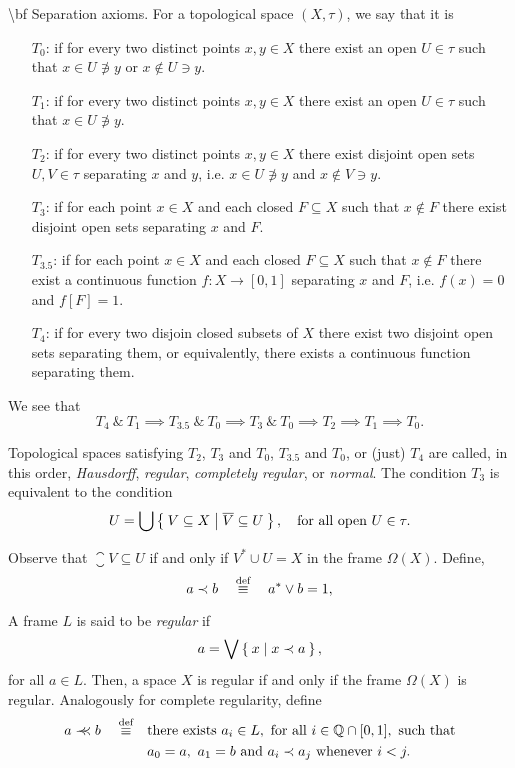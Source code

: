 \num {\bf Separation axioms.} For a topological space $(X,\tau)$, we say that it is
\begin{itemize}
    \item[$T_0$:] if for every two distinct points $x,y\in X$ there exist an open $U\in \tau$ such that $x\in U\not\ni y$ or $x\not\in U\ni y$.
    \item[$T_1$:] if for every two distinct points $x,y\in X$ there exist an open $U\in \tau$ such that $x\in U\not\ni y$.
    \item[$T_2$:] if for every two distinct points $x,y\in X$ there exist disjoint open sets $U,V\in \tau$ separating $x$ and $y$, i.e. $x\in U\not\ni y$ and $x\not\in V\ni y$.
    \item[$T_3$:] if for each point $x\in X$ and each closed $F\subseteq X$ such that $x\notin F$ there exist disjoint open sets separating $x$ and $F$.
    \item[$T_{3.5}$:] if for each point $x\in X$ and each closed $F\subseteq X$ such that $x\notin F$ there exist a continuous function $f\colon X\to [0,1]$ separating $x$ and $F$, i.e. $f(x) = 0$ and $f[F] = 1$.
    \item[$T_{4}$:] if for every two disjoin closed subsets of $X$ there exist two disjoint open sets separating them, or equivalently, there exists a continuous function separating them.
\end{itemize}

We see that
$$ T_4~\&~T_1 \implies T_{3.5}~\&~T_0 \implies T_3~\&~T_0 \implies T_2 \implies T_1 \implies T_0. $$

\noindent Topological spaces satisfying $T_2$, $T_3$ and $T_0$, $T_{3.5}$ and $T_0$, or (just) $T_4$ are called, in this order, \emph{Hausdorff}, \emph{regular}, \emph{completely regular}, or \emph{normal}.
The condition $T_3$ is equivalent to the condition
$$U = \bigcup \Set{ V\subseteq X | \overline{V} \subseteq U},\quad\text{for all open } U\in \tau.$$

Observe that $\closure V\subseteq U$ if and only if $V^*\cup U = X$ in the frame $\Omega(X)$. Define,
$$ a\prec b\quad\stackrel{\text{def}}{\equiv}\quad a^*\vee b = 1,$$

\noindent A frame $L$ is said to be \emph{regular} if
$$ a = \bigvee \Set{ x | x\prec a},$$
\noindent for all $a\in L$. Then, a space $X$ is regular if and only if the frame $\Omega(X)$ is regular.
Analogously for complete regularity, define
\begin{align*}
    a\prec\mkern-8mu\prec b\quad\stackrel{\text{def}}{\equiv}\quad &\text{there exists } a_i\in L,\text{ for all } i\in \mathbb Q\cap [0,1],\text{ such that}\\
        & a_0 = a,~ a_1 = b\text{ and } a_i\prec a_j\text{ whenever } i<j.
\end{align*}

